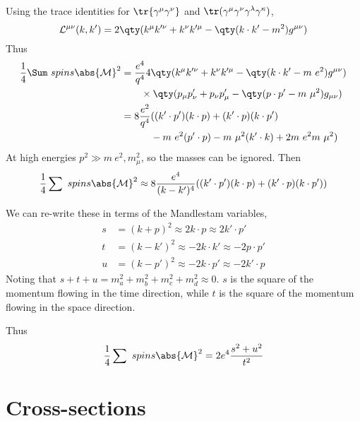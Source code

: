 Using the trace identities for $\tr{\gamma^{\mu}\gamma^{\nu}}$ and $\tr(\gamma^{\mu} \gamma^{\nu} \gamma^{\lambda} \gamma^{\kappa})$,
\begin{equation}
  \Lag^{\mu \nu}(k,k') = 2 \qty( k^{\mu} k'^{\nu} + k^{\nu} k'^{\mu} - \qty( k \cdot k' - m^2) g^{\mu \nu})
\end{equation}
Thus
\begin{align*}
  \frac{1}{4} \Sum~{spins} \abs{\mathcal{M}}^2 &= \frac{e^4}{q^4} 4 \qty( k^{\mu} k'^{\nu} + k^{\nu} k'^{\mu} - \qty( k \cdot k' - m~e^2) g^{\mu \nu}) \\ & \qquad \times 
 \qty( p_{\mu} p'_{\nu} + p_{\nu} p'_{\mu} - \qty( p \cdot p' - m~\mu^2) g_{\mu \nu}) \\ 
&= 8 \frac{e^{2}}{q^4} ( (k' \cdot p')(k \cdot p) + (k' \cdot p)(k \cdot p') \\ & \qquad \quad- m~e^2(p' \cdot p) - m~\mu^2(k' \cdot k) + 2 m~e^2 m~\mu^2 )
\end{align*}
At high energies $p^2 \gg m~e^2, m_{\mu}^2$, so the masses can be ignored. Then
\[ \frac{1}{4} \sum~{spins} \abs{\mathcal{M}}^2 \approx 8 \frac{e^4}{(k-k')^4} ((k' \cdot p')(k \cdot p) + (k' \cdot p)(k \cdot p'))\]

We can re-write these in terms of the Mandlestam variables,
\begin{subequations}
\begin{align}
  s &= (k+p)^2 \approx 2 k \cdot p \approx 2 k' \cdot p' \\
t &= (k-k')^2 \approx - 2 k \cdot k' \approx -2 p \cdot p' \\
u &= (k - p')^2 \approx -2 k \cdot p' \approx -2 k' \cdot p
\end{align}
\end{subequations}
Noting that $s+t+u = m_a^2 + m_b^2 + m_c^2 + m_d^2 \approx 0$. $s$ is
the square of the momentum flowing in the time direction, while $t$ is
the square of the momentum flowing in the space direction.

Thus
\begin{equation}
  \frac{1}{4} \sum~{spins} \abs{\mathcal{M}}^2 = 2e^4 \frac{s^2 + u^2}{t^2}
\end{equation}

\section{Cross-sections}
\label{sec:cross-sections}

